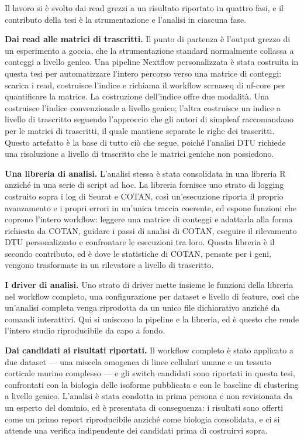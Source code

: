 Il lavoro si è svolto dai read grezzi a un risultato riportato in quattro fasi, e il contributo della tesi è la strumentazione e l'analisi in ciascuna fase.

\textbf{Dai read alle matrici di trascritti.} Il punto di partenza è l'output grezzo di un esperimento a goccia, che la strumentazione standard normalmente collassa a conteggi a livello genico. Una pipeline Nextflow personalizzata è stata costruita in questa tesi per automatizzare l'intero percorso verso una matrice di conteggi: scarica i read, costruisce l'indice e richiama il workflow scrnaseq di nf-core per quantificare la matrice. La costruzione dell'indice offre due modalità. Una costruisce l'indice convenzionale a livello genico; l'altra costruisce un indice a livello di trascritto seguendo l'approccio che gli autori di simpleaf raccomandano per le matrici di trascritti, il quale mantiene separate le righe dei trascritti. Questo artefatto è la base di tutto ciò che segue, poiché l'analisi DTU richiede una risoluzione a livello di trascritto che le matrici geniche non possiedono.

\textbf{Una libreria di analisi.} L'analisi stessa è stata consolidata in una libreria R anziché in una serie di script ad hoc. La libreria fornisce uno strato di logging costruito sopra i log di Seurat e COTAN, così un'esecuzione riporta il proprio avanzamento e i propri errori in un'unica traccia coerente, ed espone funzioni che coprono l'intero workflow: leggere una matrice di conteggi e adattarla alla forma richiesta da COTAN, guidare i passi di analisi di COTAN, eseguire il rilevamento DTU personalizzato e confrontare le esecuzioni tra loro. Questa libreria è il secondo contributo, ed è dove le statistiche di COTAN, pensate per i geni, vengono trasformate in un rilevatore a livello di trascritto.

\textbf{I driver di analisi.} Uno strato di driver mette insieme le funzioni della libreria nel workflow completo, una configurazione per dataset e livello di feature, così che un'analisi completa venga riprodotta da un unico file dichiarativo anziché da comandi interattivi. Qui si uniscono la pipeline e la libreria, ed è questo che rende l'intero studio riproducibile da capo a fondo.

\textbf{Dai candidati ai risultati riportati.} Il workflow completo è stato applicato a due dataset --- una miscela omogenea di linee cellulari umane e un tessuto corticale murino complesso --- e gli switch candidati sono riportati in questa tesi, confrontati con la biologia delle isoforme pubblicata e con le baseline di clustering a livello genico. L'analisi è stata condotta in prima persona e non revisionata da un esperto del dominio, ed è presentata di conseguenza: i risultati sono offerti come un primo report riproducibile anziché come biologia consolidata, e ci si attende una verifica indipendente dei candidati prima di costruirvi sopra.
